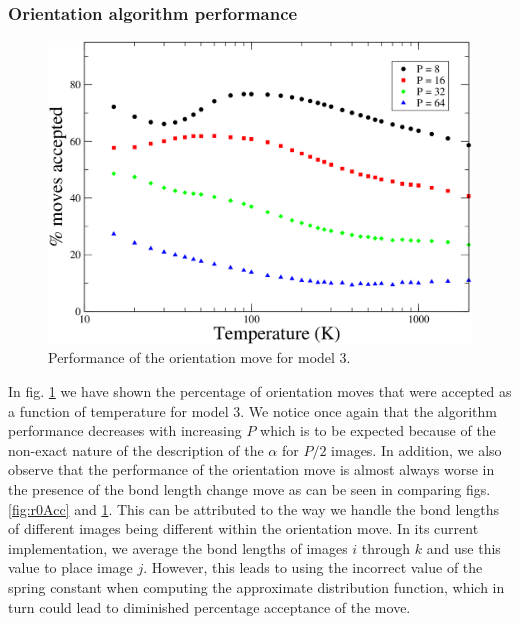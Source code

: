             \subsubsection{Orientation algorithm performance}
                \begin{figure}[!htbp]
                    \centering
                    \includegraphics[scale=0.20,keepaspectratio]{Chapter-4/Figures/s3OrAcc.png}
                    \caption{Performance of the orientation move for model 3.}
                    \label{fig:variableOrAcc}
                \end{figure}

                In fig. \ref{fig:variableOrAcc} we have shown the percentage of orientation moves that were accepted as a function of temperature for model 3. We notice once again that the algorithm performance decreases with increasing $P$ which is to be expected because of the non-exact nature of the description of the $\alpha$ for $P/2$ images. In addition, we also observe that the performance of the orientation move is almost always worse in the presence of the bond length change move as can be seen in comparing figs. \ref{fig:r0Acc} and \ref{fig:variableOrAcc}. This can be attributed to the way we handle the bond lengths of different images being different within the orientation move. In its current implementation, we average the bond lengths of images $i$ through $k$ and use this value to place image $j$. However, this leads to using the incorrect value of the spring constant when computing the approximate distribution function, which in turn could lead to diminished percentage acceptance of the move.

